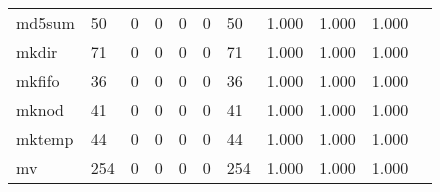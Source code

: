 \begin{longtable}{lp{1.2cm}p{1.2cm}p{1.2cm}p{1.2cm}p{1.2cm}p{1.2cm}p{1.2cm}p{1.2cm}p{1.2cm}p{1.2cm}}
md5sum    &                                    50 &                                                  0 &                                                  0 &                                                  0 &                                                  0 &                                                 50 &                                         1.000 &                                              1.000 &                                              1.000 \\
mkdir     &                                    71 &                                                  0 &                                                  0 &                                                  0 &                                                  0 &                                                 71 &                                         1.000 &                                              1.000 &                                              1.000 \\
mkfifo    &                                    36 &                                                  0 &                                                  0 &                                                  0 &                                                  0 &                                                 36 &                                         1.000 &                                              1.000 &                                              1.000 \\
mknod     &                                    41 &                                                  0 &                                                  0 &                                                  0 &                                                  0 &                                                 41 &                                         1.000 &                                              1.000 &                                              1.000 \\
mktemp    &                                    44 &                                                  0 &                                                  0 &                                                  0 &                                                  0 &                                                 44 &                                         1.000 &                                              1.000 &                                              1.000 \\
mv        &                                   254 &                                                  0 &                                                  0 &                                                  0 &                                                  0 &                                                254 &                                         1.000 &                                              1.000 &                                              1.000 \\

\end{longtable}
